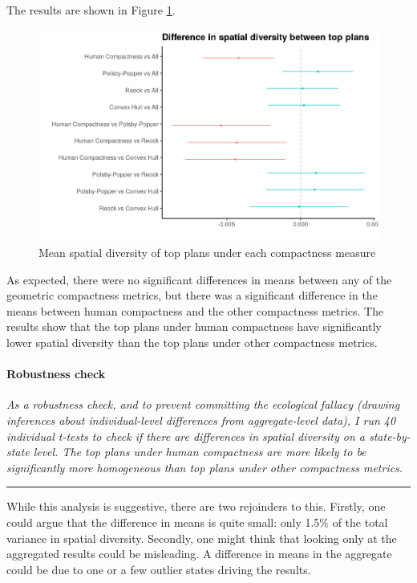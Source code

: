 \documentclass[]{article}
\let\oldparagraph\paragraph
\renewcommand{\paragraph}[1]{\oldparagraph{#1}\mbox{}}
\begin{document}
The results are shown in Figure \ref{diff_in_means}.

\begin{figure}
\centering
\includegraphics{../30_results/diff_in_means.png}
\caption{Mean spatial diversity of top plans under each compactness
measure \label{diff_in_means}}
\end{figure}

As expected, there were no significant differences in means between any
of the geometric compactness metrics, but there was a significant
difference in the means between human compactness and the other
compactness metrics. The results show that the top plans under human
compactness have significantly lower spatial diversity than the top
plans under other compactness metrics.

\hypertarget{robustness-check-2}{%
\paragraph{Robustness check}\label{robustness-check-2}}

\textsl{As a robustness check, and to prevent committing the ecological fallacy
(drawing inferences about individual-level differences from aggregate-level
data), I run 40 individual t-tests to check if there are differences in spatial
diversity on a state-by-state level. The top plans under human compactness are
more likely to be significantly more homogeneous than top plans under other
compactness metrics.}

\begin{center}\rule{0.5\linewidth}{\linethickness}\end{center}

While this analysis is suggestive, there are two rejoinders to this.
Firstly, one could argue that the difference in means is quite small:
only 1.5\% of the total variance in spatial diversity. Secondly, one
might think that looking only at the aggregated results could be
misleading. A difference in means in the aggregate could be due to one
or a few outlier states driving the results.
\end{document}
